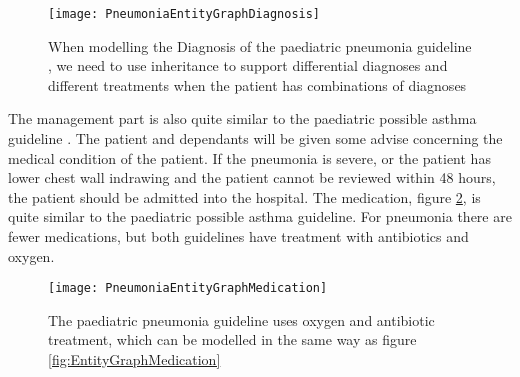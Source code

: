 \begin{figure}[h!]
	\texttt{[image: PneumoniaEntityGraphDiagnosis]}
	\caption {When modelling the Diagnosis of the paediatric pneumonia guideline \parencite{RepublicofKeny2016}, we need to use inheritance to support differential diagnoses and different treatments when the patient has combinations of diagnoses}
	\label{fig:PneumoniaEntityGraphDiagnosis}
\end{figure}


The management part is also quite similar to the paediatric possible asthma guideline \parencite{RepublicofKeny2016}. The patient and dependants will be given some advise concerning the medical condition of the patient. If the pneumonia is severe, or the patient has lower chest wall indrawing and the patient cannot be reviewed within 48 hours, the patient should be admitted into the hospital. The medication, figure \ref{fig:PneumoniaEntityMedication}, is quite similar to the paediatric possible asthma guideline. For pneumonia there are fewer medications, but both guidelines have treatment with antibiotics and oxygen.

\begin{figure}[h!]
	\texttt{[image: PneumoniaEntityGraphMedication]}
	\caption {The paediatric pneumonia guideline \parencite{RepublicofKeny2016} uses oxygen and antibiotic treatment, which can be modelled in the same way as figure \ref{fig:EntityGraphMedication}}
	\label{fig:PneumoniaEntityMedication}
\end{figure}






